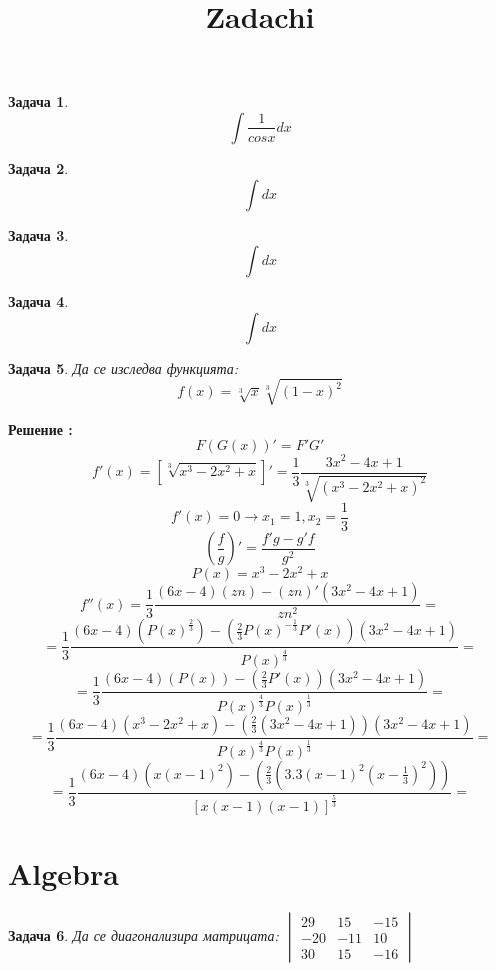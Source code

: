 \documentclass{article}
\date{}
\title{Zadachi}
\newtheorem{problem}{Задача}
\newcounter{solution}
\newcommand\solution{%
	\stepcounter{solution}%
	\textbf{Решение :}\\%
}
\begin{document}
	
	\maketitle
	
	\begin{problem}
		$$ \int \frac{1}{cosx}dx $$
	\end{problem}

	\begin{problem}
	$$ \int dx $$
\end{problem}


\begin{problem}
	$$ \int dx $$
\end{problem}

\begin{problem}
	$$ \int dx $$
\end{problem}


\begin{problem} Да се изследва функцията:
	$$ f(x) = \sqrt[3]{x} \sqrt[3]{(1-x)^2}$$
\end{problem}

\solution $$ F(G(x))' = F' G' $$ $$ f'(x) = [\sqrt[3]{x^3 - 2x^2 + x}]' = \frac{1}{3}\frac{3x^2 - 4x + 1}{\sqrt[3]{(x^3 - 2x^2 + x)^2}} $$
$$ f'(x) = 0 \to x_1 = 1, x_2 = \frac{1}{3} $$
$$ \left(\frac{f}{g}\right)' = \frac{f'g - g'f}{g^2} $$
$$ P(x) = x^3 - 2x^2 + x $$
$$f''(x) = \frac{1}{3} \frac{(6x -4)(zn) - (zn)'(3x^2-4x+1)}{zn^2} = $$
$$ =  \frac{1}{3}\frac{(6x -4)(P(x)^{\frac{2}{3}}) - (\frac{2}{3}P(x)^{-\frac{1}{3}}P'(x))(3x^2-4x+1)}{P(x)^{\frac{4}{3}}} =  $$
$$ =  \frac{1}{3}\frac{(6x -4)(P(x)) - (\frac{2}{3}P'(x))(3x^2-4x+1)}{P(x)^{\frac{4}{3}}P(x)^\frac{1}{3}} = $$
$$ =  \frac{1}{3}\frac{(6x -4)(x^3 - 2x^2 + x) - (\frac{2}{3}(3x^2 - 4x + 1 ))(3x^2-4x+1)}{P(x)^{\frac{4}{3}}P(x)^\frac{1}{3}} = $$
$$ = \frac{1}{3}\frac{(6x -4)(x(x-1)^2) - (\frac{2}{3}(3.3(x-1)^2(x-\frac{1}{3})^2 ))}{ [x(x - 1)(x - 1)]^\frac{5}{3}} = $$

\section{Algebra}

\begin{problem}
	Да се диагонализира матрицата:
	$
	\begin{vmatrix}
		29 & 15 & -15  \\ 
		-20 & -11 & 10 \\ 
		30 & 15 & -16  
	\end{vmatrix}$
\end{problem}
\end{document}
